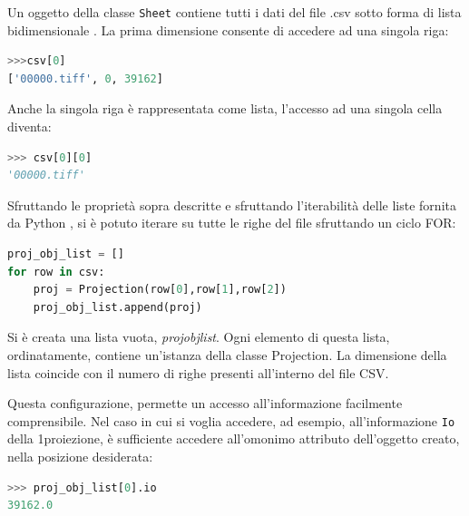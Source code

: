\documentclass[a4paper,12pt, doubleside]{report}
\begin{document}
            \bigskip
            \par
                Un oggetto della classe \texttt{Sheet} contiene tutti i dati del file .csv sotto forma di lista bidimensionale \cite{pyexcel-docs}. La prima dimensione consente di accedere ad una singola riga:
                
                \begin{lstlisting}[language=python, frame=bt]
>>>csv[0]
['00000.tiff', 0, 39162]
                \end{lstlisting}
            
                Anche la singola riga è rappresentata come lista, l'accesso ad una singola cella diventa:
                \begin{lstlisting}[language=python, frame=bt]
>>> csv[0][0]
'00000.tiff'
                \end{lstlisting}
            
            \bigskip
            \par
                Sfruttando le proprietà sopra descritte e sfruttando l'iterabilità delle liste fornita da Python \cite{python-list}, si è potuto iterare su tutte le righe del file sfruttando un ciclo FOR:
            
                \begin{lstlisting}[language=python, frame=bt]
proj_obj_list = []
for row in csv:
    proj = Projection(row[0],row[1],row[2])
    proj_obj_list.append(proj)
                \end{lstlisting}
            
                Si è creata una lista vuota, \textit{proj\textunderscore obj\textunderscore list}. Ogni elemento di questa lista, ordinatamente, contiene un'istanza della classe Projection. La dimensione della lista coincide con il numero di righe presenti all'interno del file CSV.
            
            \bigskip
            \par
                Questa configurazione, permette un accesso all'informazione facilmente comprensibile. Nel caso in cui si voglia accedere, ad esempio, all'informazione \texttt{Io} della 1\degree proiezione, è sufficiente accedere all'omonimo attributo dell'oggetto creato, nella posizione desiderata: 
            
                \begin{lstlisting}[language=python, frame=bt]
>>> proj_obj_list[0].io
39162.0
                \end{lstlisting}
            
\end{document}
